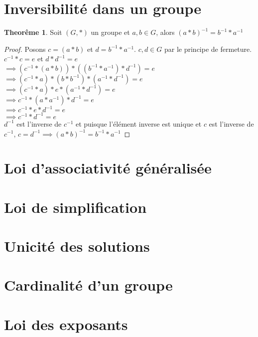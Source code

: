 \documentclass[12pt]{book}
\def\sep{\phantom{}}
\theoremstyle{definition}
\newtheorem{theorem}{Theorême}[section]
\begin{document}
\section{Inversibilité dans un groupe}
\begin{theorem}
    \label{thm:groupe_inversible}
    Soit $(G, \ast)$ un groupe et $a, b \in G$, alors $(a \ast b)^{-1} = b^{-1} \ast a^{-1}$
\end{theorem}
\begin{proof}
    Posons $c = (a \ast b)$ et $d = b^{-1} \ast a^{-1}$. \sep
    $c, d \in G$ par le principe de fermeture. \sep \\
    $c^{-1} \ast c = e$ et $d \ast d^{-1} = e$ \sep \\
    $\implies (c^{-1} \ast (a \ast b)) \ast ((b^{-1} \ast a^{-1}) \ast d^{-1}) = e$ \sep \\
    $\implies (c^{-1} \ast a) \ast (b \ast b^{-1}) \ast (a^{-1} \ast d^{-1}) = e$ \sep \\
    $\implies (c^{-1} \ast a) \ast e \ast (a^{-1} \ast d^{-1}) = e$ \sep \\
    $\implies c^{-1} \ast (a \ast a^{-1}) \ast d^{-1} = e$ \sep \\
    $\implies c^{-1} \ast e \ast d^{-1} = e$ \sep \\
    $\implies c^{-1} \ast d^{-1} = e$ \sep \\
    $d^{-1}$ est l'inverse de $c^{-1}$ et puisque l'élément inverse est unique et $c$ est l'inverse de $c^{-1}$, $c = d^{-1}\implies (a \ast b)^{-1} = b^{-1} \ast a^{-1}$
\end{proof}
\section{Loi d'associativité généralisée}
\section{Loi de simplification}
\section{Unicité des solutions}
\section{Cardinalité d'un groupe}
\section{Loi des exposants}
\end{document}
